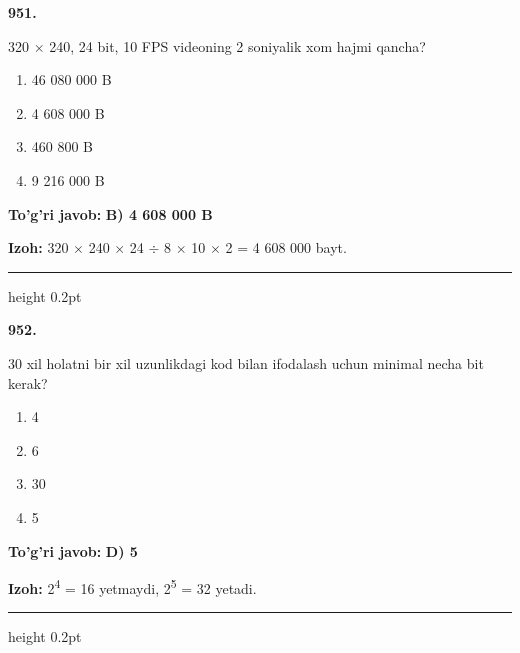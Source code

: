 \documentclass[10pt,a4paper,oneside]{article}
\begin{document}
\noindent\textbf{\color{ink}951.}
\par
320 \ensuremath{\times} 240, 24 bit, 10 FPS videoning 2 soniyalik xom hajmi qancha?
\begin{enumerate}[label=\Alph*),leftmargin=9mm]
\item 46 080 000 B
\item 4 608 000 B
\item 460 800 B
\item 9 216 000 B
\end{enumerate}
\begin{tcolorbox}[enhanced,breakable,colback=teal!4,colframe=teal!50!black,boxrule=0.5pt,arc=1.1mm,left=3mm,right=3mm,top=1.7mm,bottom=1.7mm,before skip=2mm,after skip=2mm]
\textbf{\color{teal}To'g'ri javob:} \textbf{B) 4 608 000 B}
\par\smallskip
\textbf{Izoh:} 320 \ensuremath{\times} 240 \ensuremath{\times} 24 \ensuremath{\div} 8 \ensuremath{\times} 10 \ensuremath{\times} 2 = 4 608 000 bayt.
\end{tcolorbox}
\vspace{2mm}\hrule height 0.2pt \vspace{3mm}

\noindent\textbf{\color{ink}952.}
\par
30 xil holatni bir xil uzunlikdagi kod bilan ifodalash uchun minimal necha bit kerak?
\begin{enumerate}[label=\Alph*),leftmargin=9mm]
\item 4
\item 6
\item 30
\item 5
\end{enumerate}
\begin{tcolorbox}[enhanced,breakable,colback=teal!4,colframe=teal!50!black,boxrule=0.5pt,arc=1.1mm,left=3mm,right=3mm,top=1.7mm,bottom=1.7mm,before skip=2mm,after skip=2mm]
\textbf{\color{teal}To'g'ri javob:} \textbf{D) 5}
\par\smallskip
\textbf{Izoh:} 2\textsuperscript{4} = 16 yetmaydi, 2\textsuperscript{5} = 32 yetadi.
\end{tcolorbox}
\vspace{2mm}\hrule height 0.2pt \vspace{3mm}
\end{document}
